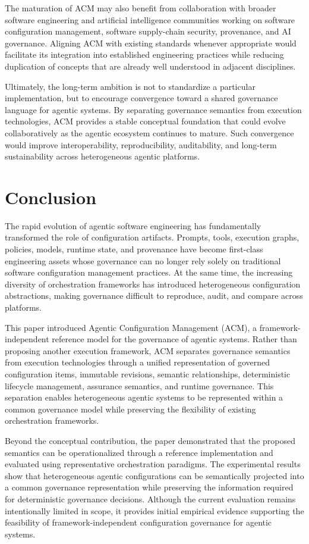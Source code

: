 \documentclass[10pt]{article}
\begin{document}
The maturation of ACM may also benefit from collaboration with broader software engineering and artificial intelligence communities working on software configuration management, software supply-chain security, provenance, and AI governance. Aligning ACM with existing standards whenever appropriate would facilitate its integration into established engineering practices while reducing duplication of concepts that are already well understood in adjacent disciplines.

Ultimately, the long-term ambition is not to standardize a particular implementation, but to encourage convergence toward a shared governance language for agentic systems. By separating governance semantics from execution technologies, ACM provides a stable conceptual foundation that could evolve collaboratively as the agentic ecosystem continues to mature. Such convergence would improve interoperability, reproducibility, auditability, and long-term sustainability across heterogeneous agentic platforms.

\section{Conclusion}
\label{sec:conclusion}

The rapid evolution of agentic software engineering has fundamentally transformed the role of configuration artifacts. Prompts, tools, execution graphs, policies, models, runtime state, and provenance have become first-class engineering assets whose governance can no longer rely solely on traditional software configuration management practices. At the same time, the increasing diversity of orchestration frameworks has introduced heterogeneous configuration abstractions, making governance difficult to reproduce, audit, and compare across platforms.

This paper introduced Agentic Configuration Management (ACM), a framework-independent reference model for the governance of agentic systems. Rather than proposing another execution framework, ACM separates governance semantics from execution technologies through a unified representation of governed configuration items, immutable revisions, semantic relationships, deterministic lifecycle management, assurance semantics, and runtime governance. This separation enables heterogeneous agentic systems to be represented within a common governance model while preserving the flexibility of existing orchestration frameworks.

Beyond the conceptual contribution, the paper demonstrated that the proposed semantics can be operationalized through a reference implementation and evaluated using representative orchestration paradigms. The experimental results show that heterogeneous agentic configurations can be semantically projected into a common governance representation while preserving the information required for deterministic governance decisions. Although the current evaluation remains intentionally limited in scope, it provides initial empirical evidence supporting the feasibility of framework-independent configuration governance for agentic systems.
\end{document}
